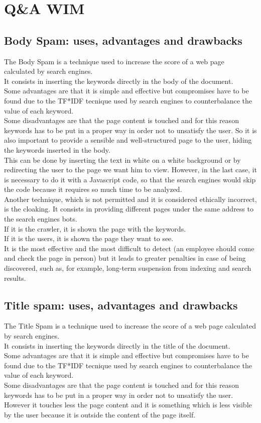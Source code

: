 \section{Q\&A WIM}
\subsection{Body Spam: uses, advantages and drawbacks}
The Body Spam is a technique used to increase
the score of a web page calculated by search
engines.\\
It consists in inserting the keywords directly
in the body of the document.\\
Some advantages are that it is simple and effective
but compromises have to be found due to the TF*IDF
tecnique used by search engines to counterbalance the value of each keyword.
\\
Some disadvantages are that the page content is touched and for this reason
keywords has to be put in a proper way in order not to unsatisfy
the user.
So it is also important to provide a sensible
and well-structured page to the user, hiding the keywords inserted
in the body.\\
This can be done by inserting the text in white on a
white background or by redirecting the user to
the page we want him to view. However, in the last case, it is necessary
to do it with a Javascript code, so that the search engines would
skip the code because it requires so much time to be analyzed.\\
Another technique, which is not permitted and it is considered
ethically incorrect, is the cloaking.
It consists in providing different pages under the same address to the
search engines bots.\\
If it is the crawler, it is shown the page with the keywords.\\
If it is the users, it is shown the page they want to see.\\
It is the most effective and the most difficult to detect
(an employee should come and check the page in person)
but it leads to greater penalties in
case of being discovered, such as, for example, long-term
suspension from indexing and search results.

\subsection{Title spam: uses, advantages and drawbacks}
The Title Spam is a technique used to increase
the score of a web page calculated by search
engines.\\
It consists in inserting the keywords directly
in the title of the document.\\
Some advantages are that it is simple and effective
but compromises have to be found due to the TF*IDF
tecnique used by search engines to counterbalance the value of each
keyword.\\ Some disadvantages are that the page content is touched and for this reason
keywords has to be put in a proper way in order not to unsatisfy
the user. However it touches less the page content and it is something
which is less visible by the user because it is outside the content
of the page itself.

